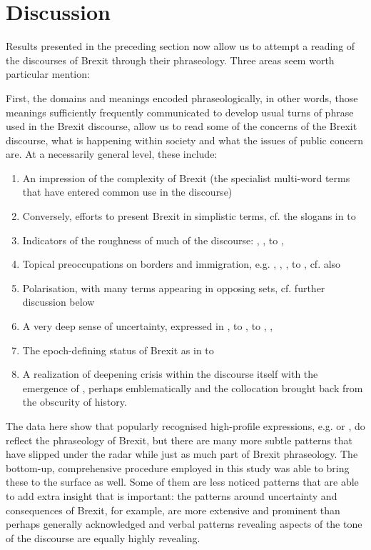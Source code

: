 \documentclass[output=paper]{langscibook}
\begin{document}
\section{Discussion}

Results presented in the preceding section now allow us to attempt a reading of the discourses of Brexit through their phraseology. Three areas seem worth particular mention:

First, the domains and meanings encoded phraseologically, in other words, those meanings sufficiently frequently communicated to develop usual turns of phrase used in the Brexit discourse, allow us to read some of the concerns of the Brexit discourse, what is happening within society and what the issues of public concern are. At a necessarily general level, these include: 

\begin{enumerate}
\item An impression of the complexity of Brexit (the specialist multi-word terms that have entered common use in the discourse)
\item Conversely, efforts to present Brexit in simplistic terms, cf. the slogans in  to 
\item Indicators of the roughness of much of the discourse: , ,  to , 
\item Topical preoccupations on borders and immigration, e.g. , , ,  to , cf. also \citet{Mair2019}
\item Polarisation, with many terms appearing in opposing sets, cf. further discussion below
\item A very deep sense of uncertainty, expressed in ,  to ,  to , , 
\item The epoch-defining status of Brexit as in  to 
\item A realization of deepening crisis within the discourse itself with the emergence of , perhaps emblematically  and the collocation  brought back from the obscurity of history.
\end{enumerate}

The data here show that popularly recognised high-profile expressions, e.g.  or , do reflect the phraseology of Brexit, but there are many more subtle patterns that have slipped under the radar while just as much part of Brexit phraseology. The bottom-up, comprehensive procedure employed in this study was able to bring these to the surface as well. Some of them are less noticed patterns that are able to add extra insight that is important: the patterns around uncertainty and consequences of Brexit, for example, are more extensive and prominent than perhaps generally acknowledged and verbal patterns revealing aspects of the tone of the discourse are equally highly revealing.
\end{document}
